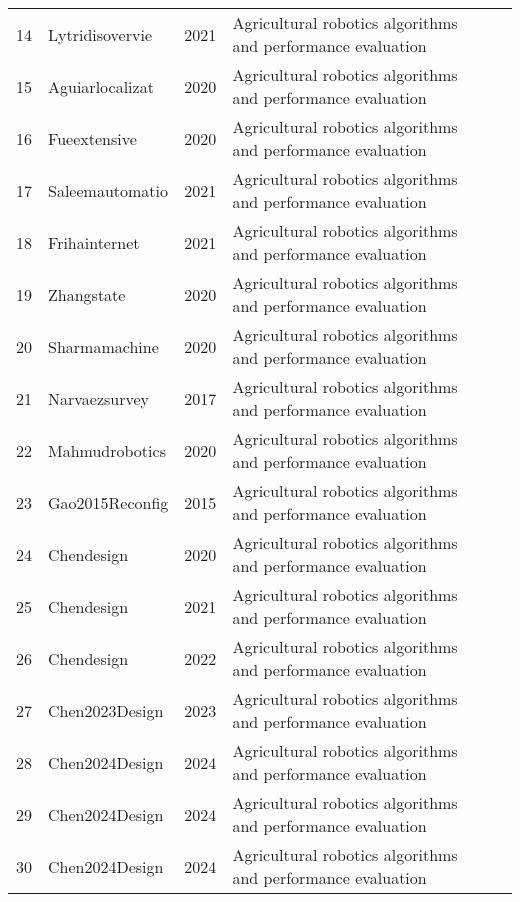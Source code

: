 \begin{table*}[htbp]
\begin{tabular}{p{}p{}p{}p{}p{}}
14 & Lytridisovervie & 2021 & Agricultural robotics algorithms and performance evaluation & \cite{lytridis2021overview} \\
15 & Aguiarlocalizat & 2020 & Agricultural robotics algorithms and performance evaluation & \cite{aguiar2020localization} \\
16 & Fueextensive & 2020 & Agricultural robotics algorithms and performance evaluation & \cite{fue2020extensive} \\
17 & Saleemautomatio & 2021 & Agricultural robotics algorithms and performance evaluation & \cite{saleem2021automation} \\
18 & Frihainternet & 2021 & Agricultural robotics algorithms and performance evaluation & \cite{friha2021internet} \\
19 & Zhangstate & 2020 & Agricultural robotics algorithms and performance evaluation & \cite{zhang2020state} \\
20 & Sharmamachine & 2020 & Agricultural robotics algorithms and performance evaluation & \cite{sharma2020machine} \\
21 & Narvaezsurvey & 2017 & Agricultural robotics algorithms and performance evaluation & \cite{narvaez2017survey} \\
22 & Mahmudrobotics & 2020 & Agricultural robotics algorithms and performance evaluation & \cite{mahmud2020robotics} \\
23 & Gao2015Reconfig & 2015 & Agricultural robotics algorithms and performance evaluation & \cite{gao2015reconfigurable} \\
24 & Chendesign & 2020 & Agricultural robotics algorithms and performance evaluation & \cite{chen2020design} \\
25 & Chendesign & 2021 & Agricultural robotics algorithms and performance evaluation & \cite{chen2021design} \\
26 & Chendesign & 2022 & Agricultural robotics algorithms and performance evaluation & \cite{chen2022design} \\
27 & Chen2023Design & 2023 & Agricultural robotics algorithms and performance evaluation & \cite{chen2023design} \\
28 & Chen2024Design & 2024 & Agricultural robotics algorithms and performance evaluation & \cite{chen2024design} \\
29 & Chen2024Design & 2024 & Agricultural robotics algorithms and performance evaluation & \cite{chen2024design} \\
30 & Chen2024Design & 2024 & Agricultural robotics algorithms and performance evaluation & \cite{chen2024design} \\

\end{tabular}
\end{table*}
